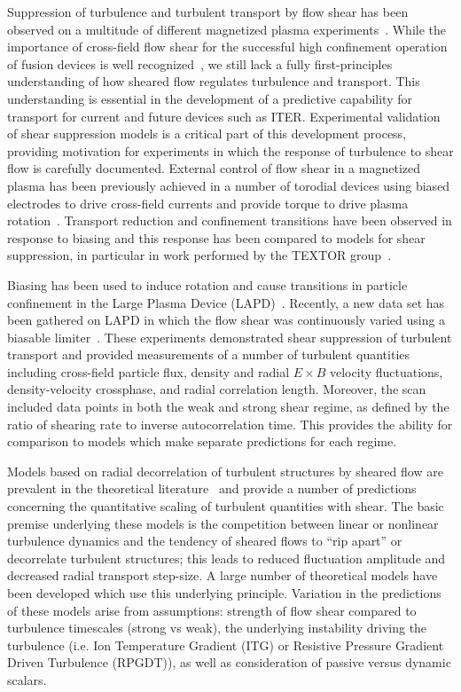 \documentclass[aip,pop,amsmath,amssymb,peprint,superscriptaddress]{revtex4-1} %
\begin{document}
Suppression of turbulence and turbulent transport by flow shear has
been observed on a multitude of different magnetized plasma
experiments~\cite{burrell97,burrell99,terry00,oost03,sakai93,maggs07,carter09,schaffner12}. While
the importance of cross-field flow shear for the successful high
confinement operation of fusion devices is well
recognized~\cite{burrell92,wagner07}, we still lack a fully first-principles
understanding of how sheared flow regulates turbulence and transport.
This understanding is essential in the development
of a predictive capability for transport for current and future
devices such as ITER. Experimental validation of shear suppression
models is a critical part of this development process, providing
motivation for experiments in which the response of turbulence to
shear flow is carefully documented.  External control of flow shear in
a magnetized plasma has been previously achieved in a number of
torodial devices using biased electrodes to drive cross-field currents
and provide torque to drive plasma
rotation~\cite{taylor89,weynants92}.   Transport reduction and
confinement transitions have been observed in response to biasing and
this response has been compared to models for shear suppression, in
particular in work performed by the TEXTOR group~\cite{weynants98,boedo00,boedo02}.

Biasing has been used to induce rotation and cause transitions in particle
confinement in the Large Plasma Device
(LAPD)~\cite{maggs07,carter09}. Recently, a new data set has been
gathered on LAPD in which the flow shear was continuously varied using
a biasable limiter~\cite{schaffner12}. These experiments demonstrated
shear suppression of turbulent transport and provided measurements of a number of turbulent quantities including cross-field particle flux, density and radial $E\times B$ velocity fluctuations, density-velocity crossphase, and radial correlation length. Moreover, the scan included data points in both the weak and strong shear regime, as defined by the ratio of shearing rate to inverse autocorrelation time.  This provides the ability for comparison to models which make separate predictions for each regime.

Models based on radial decorrelation of turbulent structures by
sheared flow are prevalent in the theoretical literature~\cite{biglari90,shaing90,zhang92,zhang93,ware96,ware98,terry01,kim03,kim04,newton11} and provide a
number of predictions concerning the quantitative scaling of turbulent
quantities with shear. The basic premise underlying these models is the competition between linear or nonlinear turbulence
dynamics and the tendency of sheared flows to ``rip apart'' or
decorrelate turbulent structures; this leads to reduced
fluctuation amplitude and decreased radial transport step-size. A
large number of theoretical models have been developed which use this
underlying principle. Variation in the predictions of these models
arise from assumptions: strength of flow shear compared to turbulence
timescales (strong vs weak), the underlying instability driving the
turbulence (i.e. Ion Temperature Gradient (ITG) or Resistive Pressure
Gradient Driven Turbulence (RPGDT)), as well as consideration of passive versus dynamic scalars. 
\end{document}
